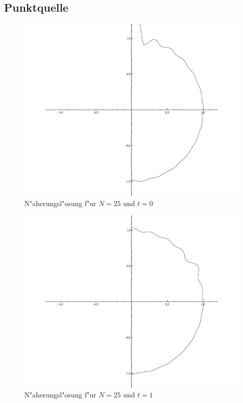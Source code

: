 \subsection{Punktquelle}
\begin{figure}
\begin{center}
\includegraphics[width=\hsize]{graphics/tsunami0}
\end{center}
\caption{N"aherungsl"osung f"ur $N=25$ und $t=0$\label{tsunami0}}
\end{figure}
\begin{figure}
\begin{center}
\includegraphics[width=\hsize]{graphics/tsunami50}
\end{center}
\caption{N"aherungsl"osung f"ur $N=25$ und $t=1$\label{tsunami50}}
\end{figure}



